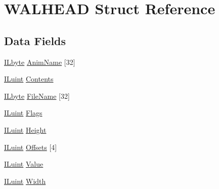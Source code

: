 \hypertarget{struct_w_a_l_h_e_a_d}{\section{W\-A\-L\-H\-E\-A\-D Struct Reference}
\label{struct_w_a_l_h_e_a_d}
}
\subsection*{Data Fields}
\begin{DoxyCompactItemize}
\item 
\hyperlink{il_8h_a88e562dacd22f4efcf6f9d31b85d4f92}{I\-Lbyte} \hyperlink{struct_w_a_l_h_e_a_d_a8aed1c42327b1f036af193908c419c58}{Anim\-Name} \mbox{[}32\mbox{]}
\item 
\hyperlink{il_8h_ac6508d0e9c19e32f32e00d54b5b8cf30}{I\-Luint} \hyperlink{struct_w_a_l_h_e_a_d_a0bde71a303d2c2397a2fac11874f4ff3}{Contents}
\item 
\hyperlink{il_8h_a88e562dacd22f4efcf6f9d31b85d4f92}{I\-Lbyte} \hyperlink{struct_w_a_l_h_e_a_d_ae82621a7cdf5119102cd2fb13ec956ac}{File\-Name} \mbox{[}32\mbox{]}
\item 
\hyperlink{il_8h_ac6508d0e9c19e32f32e00d54b5b8cf30}{I\-Luint} \hyperlink{struct_w_a_l_h_e_a_d_ad5c4db01d6ffdff05862b7052afa79fc}{Flags}
\item 
\hyperlink{il_8h_ac6508d0e9c19e32f32e00d54b5b8cf30}{I\-Luint} \hyperlink{struct_w_a_l_h_e_a_d_a8a8093d76b61a95fc96df24af29b107a}{Height}
\item 
\hyperlink{il_8h_ac6508d0e9c19e32f32e00d54b5b8cf30}{I\-Luint} \hyperlink{struct_w_a_l_h_e_a_d_acdaddbc51062dfc1e4081793cc0d305a}{Offsets} \mbox{[}4\mbox{]}
\item 
\hyperlink{il_8h_ac6508d0e9c19e32f32e00d54b5b8cf30}{I\-Luint} \hyperlink{struct_w_a_l_h_e_a_d_aac3036f762179b99adefc20530a162aa}{Value}
\item 
\hyperlink{il_8h_ac6508d0e9c19e32f32e00d54b5b8cf30}{I\-Luint} \hyperlink{struct_w_a_l_h_e_a_d_a4146e7b2b0b4097e0e335f9b348392bf}{Width}
\end{DoxyCompactItemize}


